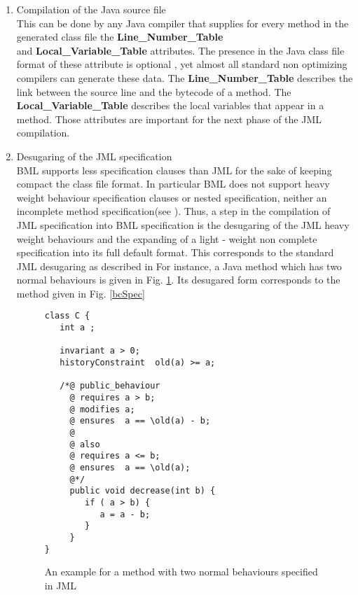 \begin{enumerate}
\item Compilation of the Java source file \\
  This can be done by any Java compiler that supplies for every method in the generated class file 
the \textbf{Line\_Number\_Table} \\ 
and \textbf{Local\_Variable\_Table}  attributes. The presence in the Java class file format of 
these attribute is optional \cite{VMSpec}, yet almost all standard non optimizing compilers can generate these data. 
The \textbf{Line\_Number\_Table} describes the link between the source line and the bytecode of a method.  
The \textbf{Local\_Variable\_Table} describes the local variables that appear in a method. 
Those attributes are important for the next phase of the JML compilation.

\item Desugaring of the JML specification \\
      BML supports less specification clauses than JML for the sake of keeping compact the class file format.
      In particular BML does not support heavy weight behaviour specification clauses or nested specification, neither an incomplete
      method specification(see  \cite{JMLRefMan}).
      Thus, a step in the compilation of JML specification into BML specification is the desugaring of the JML heavy weight
      behaviours and the expanding of a light - weight non complete specification into its full default format.
      This corresponds to the standard JML desugaring as described  in \cite{RT03djml}
      For instance, a Java method which has two normal behaviours is given in Fig. \ref{JmlSpec}. 
      Its desugared form corresponds to the method given in Fig. \ref{bcSpec}

\begin{figure}
\begin{verbatim}
class C {
   int a ;

   invariant a > 0; 
   historyConstraint  old(a) >= a;

   /*@ public_behaviour
     @ requires a > b;
     @ modifies a;
     @ ensures  a == \old(a) - b;  
     @
     @ also
     @ requires a <= b;
     @ ensures  a == \old(a);
     @*/
     public void decrease(int b) {
        if ( a > b) {
           a = a - b;
        }
     }
}
\end{verbatim}
\caption{\sc An example for a method with two normal behaviours specified in JML} \label{JmlSpec}
\end{figure}


\end{enumerate}
